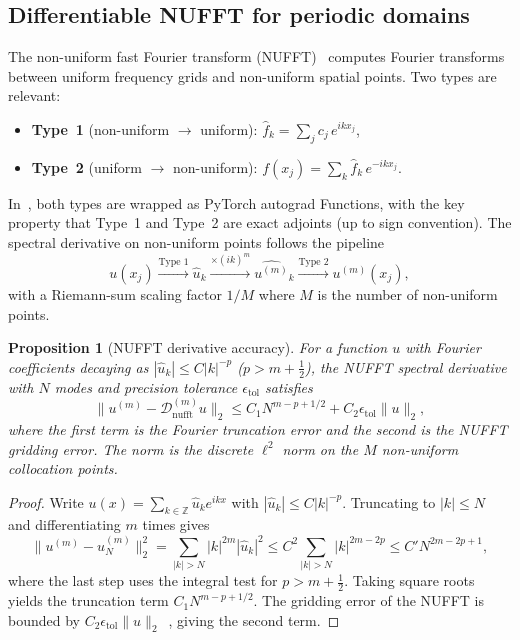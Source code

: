 \documentclass[sn-mathphys,Numbered]{sn-jnl}
\theoremstyle{thmstyleone}
\newtheorem{proposition}[theorem]{Proposition}
\theoremstyle{thmstyletwo}
\theoremstyle{thmstylethree}
\newcommand{\nufft}{\mathrm{nufft}}
\begin{document}
\subsection{Differentiable NUFFT for periodic domains}\label{subsec:diff_nufft}

The non-uniform fast Fourier transform (NUFFT)~\cite{barnett2019nonuniform} computes Fourier transforms between uniform frequency grids and non-uniform spatial points. Two types are relevant:
\begin{itemize}
    \item \textbf{Type~1} (non-uniform $\to$ uniform): $\hat{f}_k = \sum_j c_j \, e^{i k x_j}$,
    \item \textbf{Type~2} (uniform $\to$ non-uniform): $f(x_j) = \sum_k \hat{f}_k \, e^{-i k x_j}$.
\end{itemize}

In~\cite{wang2026differentiable}, both types are wrapped as PyTorch autograd Functions, with the key property that Type~1 and Type~2 are exact adjoints (up to sign convention). The spectral derivative on non-uniform points follows the pipeline
\begin{equation}
    u(x_j) \xrightarrow{\text{Type~1}} \hat{u}_k \xrightarrow{\times (ik)^m} \widehat{u^{(m)}}_k \xrightarrow{\text{Type~2}} u^{(m)}(x_j),
    \label{eq:nufft_deriv}
\end{equation}
with a Riemann-sum scaling factor $1/M$ where $M$ is the number of non-uniform points.

\begin{proposition}[NUFFT derivative accuracy]\label{prop:nufft_acc}
For a function $u$ with Fourier coefficients decaying as $|\hat{u}_k| \leq C |k|^{-p}$ ($p > m+\tfrac12$), the NUFFT spectral derivative with $N$ modes and precision tolerance $\epsilon_{\mathrm{tol}}$ satisfies
\begin{equation}
    \|u^{(m)} - \mathcal{D}_{\nufft}^{(m)} u\|_2 \leq C_1 N^{m-p+1/2} + C_2 \epsilon_{\mathrm{tol}} \|u\|_2,
    \label{eq:nufft_error}
\end{equation}
where the first term is the Fourier truncation error and the second is the NUFFT gridding error. The norm is the discrete $\ell^2$ norm on the $M$ non-uniform collocation points.
\end{proposition}
\begin{proof}
Write $u(x)=\sum_{k\in\mathbb{Z}}\hat{u}_k e^{ikx}$ with $|\hat{u}_k|\leq C|k|^{-p}$. Truncating to $|k|\leq N$ and differentiating $m$ times gives
\[
\|u^{(m)}-u_N^{(m)}\|_2^2=\sum_{|k|>N}|k|^{2m}|\hat{u}_k|^2
\leq C^2\sum_{|k|>N}|k|^{2m-2p}
\leq C' N^{2m-2p+1},
\]
where the last step uses the integral test for $p>m+\tfrac12$. Taking square roots yields the truncation term $C_1 N^{m-p+1/2}$. The gridding error of the NUFFT is bounded by $C_2\epsilon_{\mathrm{tol}}\|u\|_2$~\cite[Theorem~2.1]{barnett2019nonuniform}, giving the second term.
\end{proof}
\end{document}
